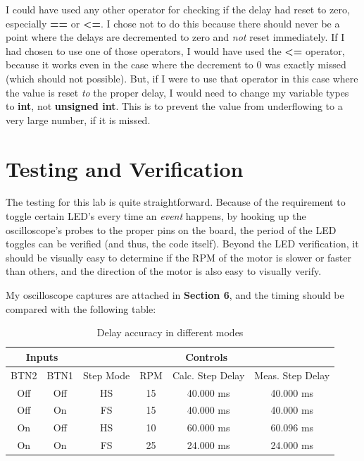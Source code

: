 \documentclass[a4paper, 12pt]{article}
\begin{document}
I could have used any other operator for checking if the delay had reset to zero, especially \textbf{==} or \textbf{<=}. I chose not to do this because there should never be a point where the delays are decremented to zero and \textit{not} reset immediately. If I had chosen to use one of those operators, I would have used the \textbf{<=} operator, because it works even in the case where the decrement to 0 was exactly missed (which should not possible). But, if I were to use that operator in this case where the value is reset \textit{to} the proper delay, I would need to change my variable types to \textbf{int}, not \textbf{unsigned int}. This is to prevent the value from underflowing to a very large number, if it is missed.

\section{Testing and Verification}
The testing for this lab is quite straightforward. Because of the requirement to toggle certain LED's every time an \textit{event} happens, by hooking up the oscilloscope's probes to the proper pins on the board, the period of the LED toggles can be verified (and thus, the code itself). Beyond the LED verification, it should be visually easy to determine if the RPM of the motor is slower or faster  than others, and the direction of the motor is also easy to visually verify.

My oscilloscope captures are attached in \textbf{Section 6}, and the timing should be compared with the following table:

\begin{table}[h]
\centering
\begin{tabular}{cc|cccc}
\multicolumn{2}{c|}{\textbf{Inputs}}  & \multicolumn{4}{c}{\textbf{Controls}} \\
\hline
BTN2 & BTN1 & Step Mode & RPM & Calc. Step Delay & Meas. Step Delay \\
\hline
Off & Off & HS & 15 & 40.000 ms & 40.000 ms \\
Off & On & FS & 15 & 40.000 ms & 40.000 ms \\
On & Off & HS & 10 &  60.000 ms & 60.096 ms \\
On & On & FS & 25 & 24.000 ms & 24.000 ms\\
\end{tabular}
\caption{Delay accuracy in different modes}
\end{table}
\end{document}
